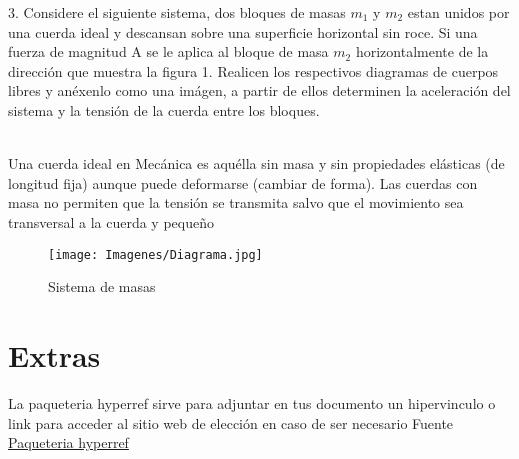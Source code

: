 \documentclass[a4paper, 12pt]{article}
\begin{document}
\newpage

3. Considere el siguiente sistema, dos bloques de masas $m_{1}$ y $m_{2}$ estan unidos por una cuerda ideal y descansan sobre una superficie horizontal sin roce. Si una fuerza de magnitud A se le aplica al bloque de masa $m_{2}$ horizontalmente de la dirección que muestra la figura 1. Realicen los respectivos diagramas de cuerpos libres y anéxenlo como una imágen, a partir de ellos determinen la aceleración del sistema y la tensión de la cuerda entre los bloques.  

\\
Una cuerda ideal en Mecánica es aquélla sin masa y sin propiedades elásticas (de longitud fija) aunque puede deformarse (cambiar de forma). Las cuerdas con masa no permiten que la tensión se transmita salvo que el movimiento sea transversal a la cuerda y pequeño
\begin{figure}[h]
    \centering
    \texttt{[image: Imagenes/Diagrama.jpg]}
    \caption{Sistema de masas}
    \label{Diagrama}
\end{figure}
\newpage
\section{Extras}
La paqueteria hyperref sirve para adjuntar en tus documento un hipervinculo o link para acceder al sitio web de elección en caso de ser necesario
Fuente 
\href{http://www.overleaf.com}{Paqueteria hyperref}
\end{document}
